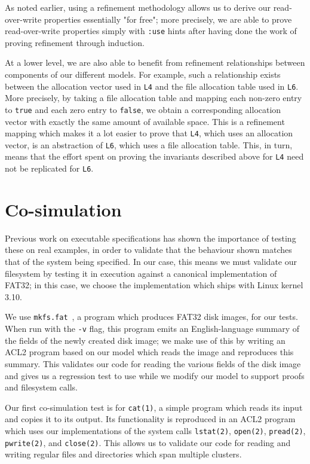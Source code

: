 \documentclass[submission,copyright,creativecommons]{eptcs}
\begin{document}
As noted earlier, using a refinement methodology allows us to derive
our read-over-write properties essentially "for free"; more precisely,
we are able to prove read-over-write properties simply with
\texttt{:use} hints after having done the work of proving refinement
through induction.

At a lower level, we are also able to benefit from refinement
relationships between components of our different models. For example,
such a relationship exists between the allocation vector used in
\texttt{L4} and the file allocation table used in \texttt{L6}. More
precisely, by taking a file allocation table and mapping each non-zero
entry to \texttt{true} and each zero entry to \texttt{false}, we
obtain a corresponding allocation vector with exactly the same amount
of available space. This is a refinement mapping which makes it a lot
easier to prove that \texttt{L4}, which uses an allocation vector, is
an abstraction of \texttt{L6}, which uses a file allocation
table. This, in turn, means that the effort spent on proving the
invariants described above for \texttt{L4} need not be replicated for
\texttt{L6}.

\section{Co-simulation}

Previous work on executable specifications \cite{goel2014simulation}
has shown the importance of testing these on real examples, in order
to validate that the behaviour shown matches that of the system being
specified. In our case, this means we must validate our filesystem by
testing it in execution against a canonical implementation of FAT32;
in this case, we choose the implementation which ships with Linux
kernel 3.10.

We use \texttt{mkfs.fat}~\cite{hudsonmkfs}, a program which produces
FAT32 disk images, for our tests. When run with the \texttt{-v} flag,
this program emits an English-language summary of the fields of the
newly created disk image; we make use of this by writing an ACL2
program based on our model which reads the image and reproduces this
summary. This validates our code for reading the various fields of the
disk image and gives us a regression test to use while we modify our
model to support proofs and filesystem calls.

Our first co-simulation test is for \texttt{cat(1)}, a simple program
which reads its input and copies it to its output. Its functionality
is reproduced in an ACL2 program which uses our implementations of the
system calls \texttt{lstat(2)}, \texttt{open(2)}, \texttt{pread(2)},
\texttt{pwrite(2)}, and \texttt{close(2)}. This allows us to validate
our code for reading and writing regular files and directories which
span multiple clusters.
\end{document}
